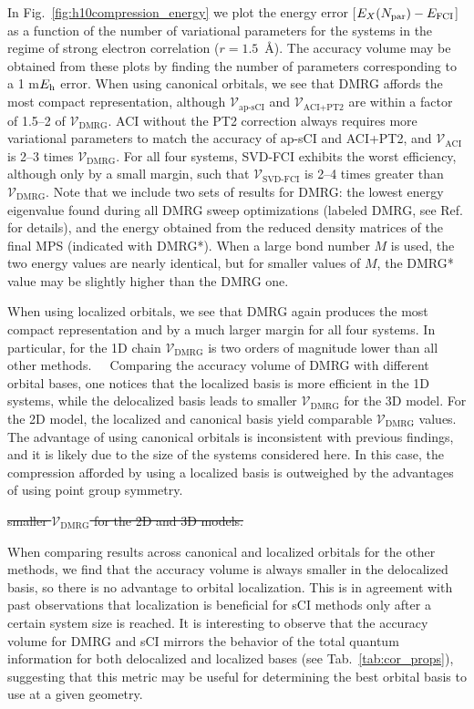 \documentclass[aip,jcp,amsmath,amssymb, preprint]{revtex4-1}
\newcommand*{\Eh}{$E_{\rm h}$\xspace}
\newcommand{\addnew}[1]{\colorbox{goodorange}{\textcolor{white}{\footnotesize  \fontfamily{phv}\selectfont +}}
\textcolor{goodorange}{{#1}}\xspace
}
\newcommand{\remove}[1]{
\colorbox{goodred}{\textcolor{white}{\footnotesize  \fontfamily{phv}\selectfont \textminus\vphantom{c}}}
\textcolor{goodred}{\sout{#1}}\xspace
}
\begin{document}
In Fig.~\ref{fig:h10compression_energy} we plot the energy error [$E_X(N_{\rm{par}}) - E_\mathrm{FCI}$] as a function of the number of variational parameters for the  systems in the regime of strong electron correlation ($r=1.5$~{\AA}).
The accuracy volume may be obtained from these plots by finding the number of parameters corresponding to a 1 m\Eh error.
When using canonical orbitals, we see that DMRG affords the most compact representation, although $\mathcal{V}_{\text{ap-sCI}}$ and $\mathcal{V}_{\text{ACI+PT2}}$   are within a factor of 1.5--2 of $\mathcal{V}_{\text{DMRG}}$.
ACI without the PT2 correction always requires more variational parameters to match the accuracy of ap-sCI and ACI+PT2, and $\mathcal{V}_{\text{ACI}}$ is 2--3 times $\mathcal{V}_{\text{DMRG}}$.
For all four  systems, SVD-FCI exhibits the worst efficiency, although only by a small margin, such that $\mathcal{V}_{\text{SVD-FCI}}$ is 2--4 times greater than $\mathcal{V}_{\text{DMRG}}$.
Note that we include two sets of results for DMRG: the lowest energy eigenvalue found during all DMRG sweep optimizations (labeled DMRG, see Ref.  for details), and the energy obtained from the reduced density matrices of the final MPS (indicated with DMRG*). 
When a large bond number $M$ is used, the two energy values are nearly identical, but for smaller values of $M$, the DMRG* value may be slightly higher than the DMRG one.

When using localized orbitals, we see that DMRG again produces the most compact representation and by a much larger margin for all four  systems.  
In particular, for the 1D chain $\mathcal{V}_{\text{DMRG}}$ is two orders of magnitude lower than all other methods.
\addnew{Comparing the accuracy volume of DMRG with different orbital bases, one notices that the localized basis is more efficient in the 1D systems, while the delocalized basis leads to smaller $\mathcal{V}_{\text{DMRG}}$ for the 3D model. For the 2D model, the localized and canonical basis yield comparable $\mathcal{V}_{\text{DMRG}}$ values.
The advantage of using canonical orbitals is inconsistent with previous findings,\cite{Olivares2015TheAbinitio} and it is likely due to the size of the systems considered here.
In this case, the compression afforded by using a localized basis is outweighed by the advantages of using point group symmetry.
}
\remove{smaller $\mathcal{V}_{\text{DMRG}}$ for the 2D and 3D models.}
When comparing results across canonical and localized orbitals for the other methods, we find that the accuracy volume is always smaller in the delocalized basis, so there is no advantage to orbital localization.
This is in agreement with past observations\cite{schriber2018combined} that localization is beneficial for sCI methods only after a certain system size is reached.
It is interesting to observe that the accuracy volume for DMRG and sCI mirrors the behavior of the total quantum information for both delocalized and localized bases (see Tab.~\ref{tab:cor_props}), suggesting that this metric may be useful for determining the best orbital basis to use at a given geometry.
\end{document}
